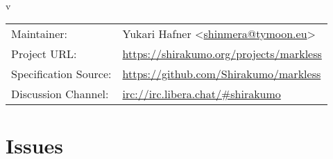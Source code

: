\documentclass[12pt,a4paper,titlepage]{article}
\title{\doctitle}
\author{\docauthor}
\date{\d_mny\today}
\begin{document}
\begin{titlepage}
  \begin{center}
    \vspace*{5cm}
    {\bfseries\fontsize{32pt}{30pt}\selectfont\doctitle} \\
    \vspace{0.5cm}
    {\large v\gittag}
    \vfill
    \begin{tabular}{ll}
      Maintainer: & Yukari Hafner <\href{mailto:shinmera@tymoon.eu}{shinmera@tymoon.eu}> \\
      Project URL: & \url{https://shirakumo.org/projects/markless} \\
      Specification Source: & \url{https://github.com/Shirakumo/markless} \\
      Discussion Channel: & \url{irc://irc.libera.chat/#shirakumo} \\
    \end{tabular}
  \end{center}
\end{titlepage}
\tableofcontents








\newpage\section*{Issues}\label{section:ISSUES}

\glsaddall
\newpage\label{section:GLOSSARY}\printglossaries
\end{document}

